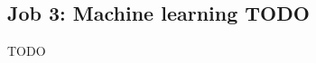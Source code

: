 

\subsection[%
    Job 3: Machine learning%
  ]{%
    Job 3: Machine learning TODO%
  }\label{subsec:job3}

  TODO
